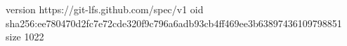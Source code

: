 version https://git-lfs.github.com/spec/v1
oid sha256:ee780470d2fc7e72cde320f9c796a6adb93cb4ff469ee3b63897436109798851
size 1022
